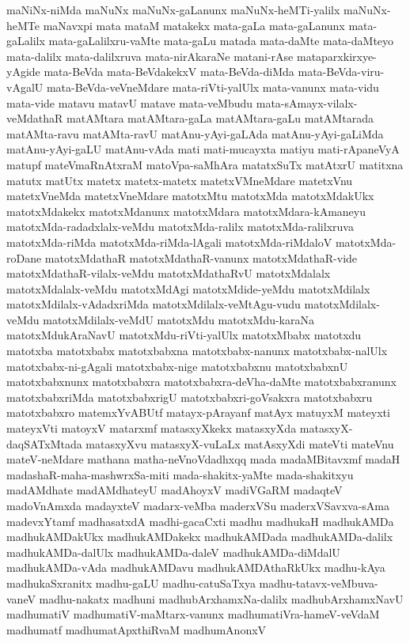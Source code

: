{maNiNx-niMda
maNuNx
maNuNx-gaLanunx
maNuNx-heMTi-yalilx
maNuNx-heMTe
maNavxpi
mata
mataM
matakekx
mata-gaLa
mata-gaLanunx
mata-gaLalilx
mata-gaLalilxru-vaMte
mata-gaLu
matada
mata-daMte
mata-daMteyo
mata-dalilx
mata-dalilxruva
mata-nirAkaraNe
matani-rAse
mataparxkirxye-yAgide
mata-BeVda
mata-BeVdakekxV
mata-BeVda-diMda
mata-BeVda-viru-vAgalU
mata-BeVda-veVneMdare
mata-riVti-yalUlx
mata-vanunx
mata-vidu
mata-vide
matavu
matavU
matave
mata-veMbudu
mata-sAmayx-vilalx-veMdathaR
matAMtara
matAMtara-gaLa
matAMtara-gaLu
matAMtarada
matAMta-ravu
matAMta-ravU
matAnu-yAyi-gaLAda
matAnu-yAyi-gaLiMda
matAnu-yAyi-gaLU
matAnu-vAda
mati
mati-mucayxta
matiyu
mati-rApaneVyA
matupf
mateVmaRnAtxraM
matoVpa-saMhAra
matatxSuTx
matAtxrU
matitxna
matutx
matUtx
matetx
matetx-matetx
matetxVMneMdare
matetxVnu
matetxVneMda
matetxVneMdare
matotxMtu
matotxMda
matotxMdakUkx
matotxMdakekx
matotxMdanunx
matotxMdara
matotxMdara-kAmaneyu
matotxMda-radadxlalx-veMdu
matotxMda-ralilx
matotxMda-ralilxruva
matotxMda-riMda
matotxMda-riMda-lAgali
matotxMda-riMdaloV
matotxMda-roDane
matotxMdathaR
matotxMdathaR-vanunx
matotxMdathaR-vide
matotxMdathaR-vilalx-veMdu
matotxMdathaRvU
matotxMdalalx
matotxMdalalx-veMdu
matotxMdAgi
matotxMdide-yeMdu
matotxMdilalx
matotxMdilalx-vAdadxriMda
matotxMdilalx-veMtAgu-vudu
matotxMdilalx-veMdu
matotxMdilalx-veMdU
matotxMdu
matotxMdu-karaNa
matotxMdukAraNavU
matotxMdu-riVti-yalUlx
matotxMbabx
matotxdu
matotxba
matotxbabx
matotxbabxna
matotxbabx-nanunx
matotxbabx-nalUlx
matotxbabx-ni-gAgali
matotxbabx-nige
matotxbabxnu
matotxbabxnU
matotxbabxnunx
matotxbabxra
matotxbabxra-deVha-daMte
matotxbabxranunx
matotxbabxriMda
matotxbabxrigU
matotxbabxri-goVsakxra
matotxbabxru
matotxbabxro
matemxYvABUtf
matayx-pArayanf
matAyx
matuyxM
mateyxti
mateyxVti
matoyxV
matarxmf
matasxyXkekx
matasxyXda
matasxyX-daqSATxMtada
matasxyXvu
matasxyX-vuLaLx
matAsxyXdi
mateVti
mateVnu
mateV-neMdare
mathana
matha-neVnoVdadhxqq
mada
madaMBitavxmf
madaH
madashaR-maha-mashwrxSa-miti
mada-shakitx-yaMte
mada-shakitxyu
madAMdhate
madAMdhateyU
madAhoyxV
madiVGaRM
madaqteV
madoVnAmxda
madayxteV
madarx-veMba
maderxVSu
maderxVSavxva-sAma
madevxYtamf
madhasatxdA
madhi-gacaCxti
madhu
madhukaH
madhukAMDa
madhukAMDakUkx
madhukAMDakekx
madhukAMDada
madhukAMDa-dalilx
madhukAMDa-dalUlx
madhukAMDa-daleV
madhukAMDa-diMdalU
madhukAMDa-vAda
madhukAMDavu
madhukAMDAthaRkUkx
madhu-kAya
madhukaSxranitx
madhu-gaLU
madhu-catuSaTxya
madhu-tatavx-veMbuva-vaneV
madhu-nakatx
madhuni
madhubArxhamxNa-dalilx
madhubArxhamxNavU
madhumatiV
madhumatiV-maMtarx-vanunx
madhumatiVra-hameV-veVdaM
madhumatf
madhumatApxthiRvaM
madhumAnonxV
}
